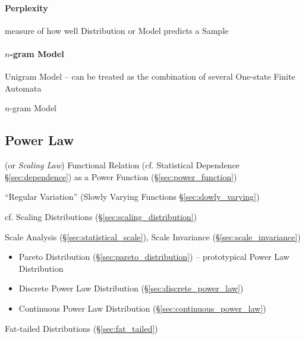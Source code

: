\paragraph{Perplexity}\label{sec:perplexity}\hfill

measure of how well Distribution or Model predicts a Sample




\paragraph{$n$-gram Model}\label{sec:ngram_model}\hfill

Unigram Model -- can be treated as the combination of several One-state Finite
Automata

$n$-gram Model



\subsection{Power Law}\label{sec:power_law}

(or \emph{Scaling Law}) Functional Relation (cf.
Statistical Dependence \S\ref{sec:dependence}) as a Power Function
(\S\ref{sec:power_function})

``Regular Variation'' (Slowly Varying Functions \S\ref{sec:slowly_varying})

cf. Scaling Distributions (\S\ref{sec:scaling_distribution})


Scale Analysis (\S\ref{sec:statistical_scale}), Scale Invariance
(\S\ref{sec:scale_invariance})

\begin{itemize}
  \item Pareto Distribution (\S\ref{sec:pareto_distribution}) -- prototypical
    Power Law Distribution
  \item Discrete Power Law Distribution (\S\ref{sec:discrete_power_law})
  \item Continuous Power Law Distribution (\S\ref{sec:continuous_power_law})
\end{itemize}

\fist Fat-tailed Distributions (\S\ref{sec:fat_tailed})

